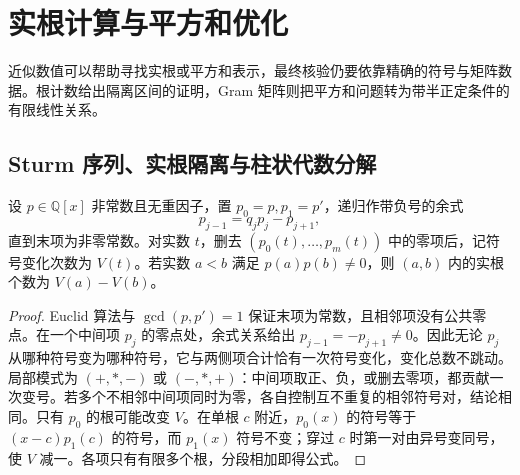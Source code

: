 
\section{实根计算与平方和优化}
\label{b3:sec:G05}

近似数值可以帮助寻找实根或平方和表示，最终核验仍要依靠精确的符号与矩阵数据。根计数给出隔离区间的证明，Gram 矩阵则把平方和问题转为带半正定条件的有限线性关系。


\subsection{Sturm 序列、实根隔离与柱状代数分解}
\label{b3:subsec:G05:01}

\begin{theorem}\label{b3:thm:appendix-sturm-count}
	设 \(p\in\mathbb Q[x]\) 非常数且无重因子，置 \(p_0=p,p_1=p'\)，递归作带负号的余式
	\[
		p_{j-1}=q_jp_j-p_{j+1},
	\]
	直到末项为非零常数。对实数 \(t\)，删去 \((p_0(t),\ldots,p_m(t))\) 中的零项后，记符号变化次数为 \(V(t)\)。若实数 \(a<b\) 满足 \(p(a)p(b)\ne0\)，则 \((a,b)\) 内的实根个数为 \(V(a)-V(b)\)。
\end{theorem}
\begin{proof}
	Euclid 算法与 \(\gcd(p,p')=1\) 保证末项为常数，且相邻项没有公共零点。在一个中间项 \(p_j\) 的零点处，余式关系给出 \(p_{j-1}=-p_{j+1}\ne0\)。因此无论 \(p_j\) 从哪种符号变为哪种符号，它与两侧项合计恰有一次符号变化，变化总数不跳动。局部模式为 \((+,\ast,-)\) 或 \((-,\ast,+)\)：中间项取正、负，或删去零项，都贡献一次变号。若多个不相邻中间项同时为零，各自控制互不重复的相邻符号对，结论相同。只有 \(p_0\) 的根可能改变 \(V\)。在单根 \(c\) 附近，\(p_0(x)\) 的符号等于 \((x-c)p_1(c)\) 的符号，而 \(p_1(x)\) 符号不变；穿过 \(c\) 时第一对由异号变同号，使 \(V\) 减一。各项只有有限多个根，分段相加即得公式。
\end{proof}

